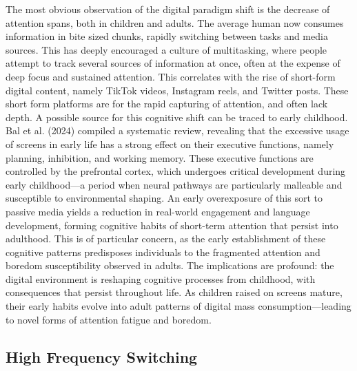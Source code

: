 \documentclass[12pt,letterpaper]{article}
\begin{document}
The most obvious observation of the digital paradigm shift is the decrease of attention spans, both in children and adults. The average human now consumes information in bite sized chunks, rapidly switching between tasks and media sources. This has deeply encouraged a culture of multitasking, where people attempt to track several sources of information at once, often at the expense of deep focus and sustained attention. This correlates with the rise of short-form digital content, namely TikTok videos, Instagram reels, and Twitter posts. These short form platforms are for the rapid capturing of attention, and often lack depth. A possible source for this cognitive shift can be traced to early childhood. Bal et al. (2024) compiled a systematic review, revealing that the excessive usage of screens in early life has a strong effect on their executive functions, namely planning, inhibition, and working memory. These executive functions are controlled by the prefrontal cortex, which undergoes critical development during early childhood---a period when neural pathways are particularly malleable and susceptible to environmental shaping. An early overexposure of this sort to passive media yields a reduction in real-world engagement and language development, forming cognitive habits of short-term attention that persist into adulthood. This is of particular concern, as the early establishment of these cognitive patterns predisposes individuals to the fragmented attention and boredom susceptibility observed in adults. The implications are profound: the digital environment is reshaping cognitive processes from childhood, with consequences that persist throughout life. As children raised on screens mature, their early habits evolve into adult patterns of digital mass consumption---leading to novel forms of attention fatigue and boredom.

\subsection*{High Frequency Switching}
\end{document}
